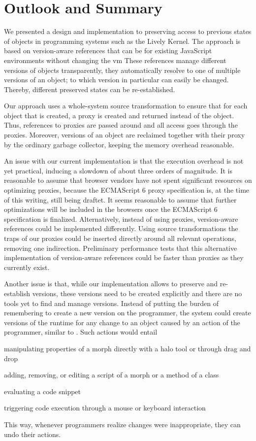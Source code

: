 \section{Outlook and Summary} \label{chapter:SUMMARY} \label{chapter:FUTURE_WORK}

We presented a design and implementation to preserving access to previous states of objects in programming systems such as the Lively Kernel.
The approach is based on version-aware references that can be for existing JavaScript environments without changing the \ac{vm}
These references manage different versions of objects transparently, \ie they automatically resolve to one of multiple versions of an object; to which version in particular can easily be changed.
Thereby, different preserved states can be re-established.

Our approach uses a whole-system source transformation to ensure that for each object that is created, a proxy is created and returned instead of the object.
Thus, references to proxies are passed around and all access goes through the proxies.
Moreover, versions of an object are reclaimed together with their proxy by the ordinary garbage collector, keeping the memory overhead reasonable.

An issue with our current implementation is that the execution overhead is not yet practical, inducing a slowdown of about three orders of magnitude.
It is reasonable to assume that browser vendors have not spent significant resources on optimizing proxies, because the ECMAScript 6 proxy specification is, at the time of this writing, still being draftet.
It seems reasonable to assume that further optimizations will be included in the browsers once the ECMAScript 6 specification is finalized.
Alternatively, instead of using proxies, version-aware references could be implemented differently.
Using source transformations the traps of our proxies could be inserted directly around all relevant operations, removing one indirection.
Preliminary performance tests that this alternative implementation of version-aware references could be faster than proxies as they currently exist.

Another issue is that, while our implementation allows to preserve and re-establish versions, these versions need to be created explicitly and there are no tools yet to find and manage versions.
Instead of putting the burden of remembering to create a new version on the programmer, the system could create versions of the runtime for any change to an object caused by an action of the programmer, similar to \coexist.
Such actions would entail
\begin{inparaenum}[a)]
    \item manipulating properties of a morph directly with a halo tool or through drag and drop
    \item adding, removing, or editing a script of a morph or a method of a class
    \item evaluating a code snippet
    \item triggering code execution through a mouse or keyboard interaction
\end{inparaenum}
This way, whenever programmers realize changes were inappropriate, they can undo their actions.


